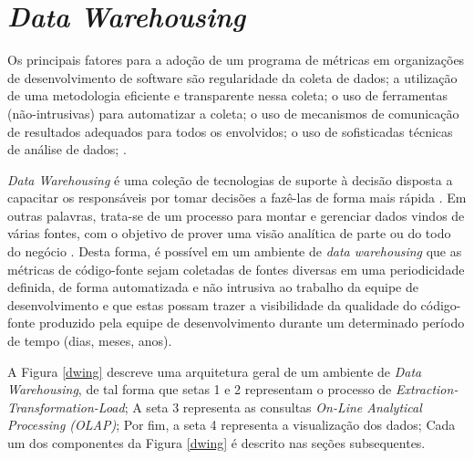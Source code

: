 \chapter{\textit{Data Warehousing}} 

Os principais fatores para a adoção de um programa de métricas em 
organizações de desenvolvimento de software são
regularidade da coleta de dados;
a utilização de uma metodologia eficiente e transparente nessa coleta; 
o uso de ferramentas (não-intrusivas) para automatizar a coleta; 
o uso de mecanismos de comunicação de resultados adequados para todos os envolvidos; 
o uso de sofisticadas técnicas de análise de dados;
.



\textit{Data Warehousing} é uma coleção de tecnologias de suporte à decisão disposta a capacitar os responsáveis por tomar decisões a fazê-las de forma mais rápida . Em outras palavras, trata-se de um processo para montar e gerenciar dados vindos de várias fontes, com o objetivo de prover uma visão analítica de parte ou do todo do negócio \cite{gardner1998}. Desta forma, é possível em um ambiente de \textit{data warehousing} que as métricas de código-fonte sejam coletadas de fontes diversas em uma periodicidade definida, de forma automatizada e não intrusiva ao trabalho da equipe de desenvolvimento e que estas possam trazer a visibilidade da qualidade do código-fonte produzido pela equipe de desenvolvimento durante um determinado período de tempo (dias, meses, anos). 

A Figura \ref{dwing} descreve uma arquitetura geral de um ambiente de \textit{Data Warehousing}, de tal forma que setas 1 e 2 representam o processo de \textit{Extraction-Transformation-Load}; A seta 3 representa as consultas \textit{On-Line Analytical Processing (OLAP)}; Por fim, a seta 4 representa a visualização dos dados; Cada um dos componentes da Figura \ref{dwing} é descrito nas seções subsequentes.

